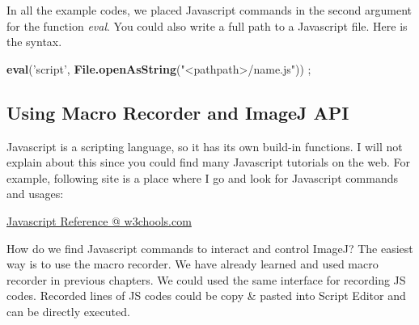 \documentclass[11pt,a4paper,oneside]{report}
\newenvironment{indentCom}%
{\begin{list}{}%
         {\setlength{\leftmargin}{1em}}%
         \item[]%
}
{\end{list}}
\begin{document}
In all the example codes, we placed Javascript commands in the second argument 
for the function \textit{eval}. 
You could also write a full path to a Javascript file. Here is the syntax. 
\begin{shaded}
\begin{indentCom}
\item \textbf{eval}('script', \textbf{File.openAsString}("<pathpath>/name.js")) ;
\end{indentCom}
\end{shaded}

\subsection{Using Macro Recorder and ImageJ API}
Javascript is a scripting language, so it has its own build-in functions. 
I will not explain about this since you could find many Javascript tutorials on the web. 
For example, following site is a place where I go and look for Javascript commands and usages:

\href{http://www.w3schools.com/jsref/default.asp}{Javascript Reference @ w3chools.com}

How do we find Javascript commands to interact and control ImageJ? 
The easiest way is to use the macro recorder. 
We have already learned and used macro recorder in previous chapters. 
We could used the same interface for recording JS codes. 
Recorded lines of JS codes could be copy \& pasted into Script Editor and can be directly executed. 
\end{document}
